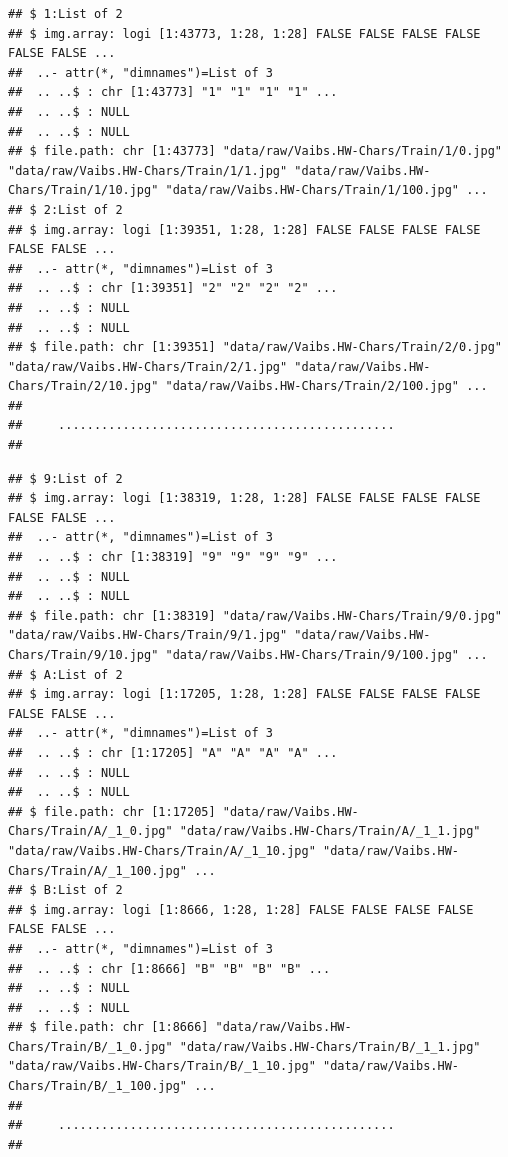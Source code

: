 \documentclass[
]{report}
\begin{document}
\begin{verbatim}
## $ 1:List of 2
## $ img.array: logi [1:43773, 1:28, 1:28] FALSE FALSE FALSE FALSE FALSE FALSE ...
##  ..- attr(*, "dimnames")=List of 3
##  .. ..$ : chr [1:43773] "1" "1" "1" "1" ...
##  .. ..$ : NULL
##  .. ..$ : NULL
## $ file.path: chr [1:43773] "data/raw/Vaibs.HW-Chars/Train/1/0.jpg" "data/raw/Vaibs.HW-Chars/Train/1/1.jpg" "data/raw/Vaibs.HW-Chars/Train/1/10.jpg" "data/raw/Vaibs.HW-Chars/Train/1/100.jpg" ...
## $ 2:List of 2
## $ img.array: logi [1:39351, 1:28, 1:28] FALSE FALSE FALSE FALSE FALSE FALSE ...
##  ..- attr(*, "dimnames")=List of 3
##  .. ..$ : chr [1:39351] "2" "2" "2" "2" ...
##  .. ..$ : NULL
##  .. ..$ : NULL
## $ file.path: chr [1:39351] "data/raw/Vaibs.HW-Chars/Train/2/0.jpg" "data/raw/Vaibs.HW-Chars/Train/2/1.jpg" "data/raw/Vaibs.HW-Chars/Train/2/10.jpg" "data/raw/Vaibs.HW-Chars/Train/2/100.jpg" ...
## 
##     ...............................................
## 
\end{verbatim}

\normalsize

\footnotesize

\begin{verbatim}
## $ 9:List of 2
## $ img.array: logi [1:38319, 1:28, 1:28] FALSE FALSE FALSE FALSE FALSE FALSE ...
##  ..- attr(*, "dimnames")=List of 3
##  .. ..$ : chr [1:38319] "9" "9" "9" "9" ...
##  .. ..$ : NULL
##  .. ..$ : NULL
## $ file.path: chr [1:38319] "data/raw/Vaibs.HW-Chars/Train/9/0.jpg" "data/raw/Vaibs.HW-Chars/Train/9/1.jpg" "data/raw/Vaibs.HW-Chars/Train/9/10.jpg" "data/raw/Vaibs.HW-Chars/Train/9/100.jpg" ...
## $ A:List of 2
## $ img.array: logi [1:17205, 1:28, 1:28] FALSE FALSE FALSE FALSE FALSE FALSE ...
##  ..- attr(*, "dimnames")=List of 3
##  .. ..$ : chr [1:17205] "A" "A" "A" "A" ...
##  .. ..$ : NULL
##  .. ..$ : NULL
## $ file.path: chr [1:17205] "data/raw/Vaibs.HW-Chars/Train/A/_1_0.jpg" "data/raw/Vaibs.HW-Chars/Train/A/_1_1.jpg" "data/raw/Vaibs.HW-Chars/Train/A/_1_10.jpg" "data/raw/Vaibs.HW-Chars/Train/A/_1_100.jpg" ...
## $ B:List of 2
## $ img.array: logi [1:8666, 1:28, 1:28] FALSE FALSE FALSE FALSE FALSE FALSE ...
##  ..- attr(*, "dimnames")=List of 3
##  .. ..$ : chr [1:8666] "B" "B" "B" "B" ...
##  .. ..$ : NULL
##  .. ..$ : NULL
## $ file.path: chr [1:8666] "data/raw/Vaibs.HW-Chars/Train/B/_1_0.jpg" "data/raw/Vaibs.HW-Chars/Train/B/_1_1.jpg" "data/raw/Vaibs.HW-Chars/Train/B/_1_10.jpg" "data/raw/Vaibs.HW-Chars/Train/B/_1_100.jpg" ...
## 
##     ...............................................
## 
\end{verbatim}
\end{document}
